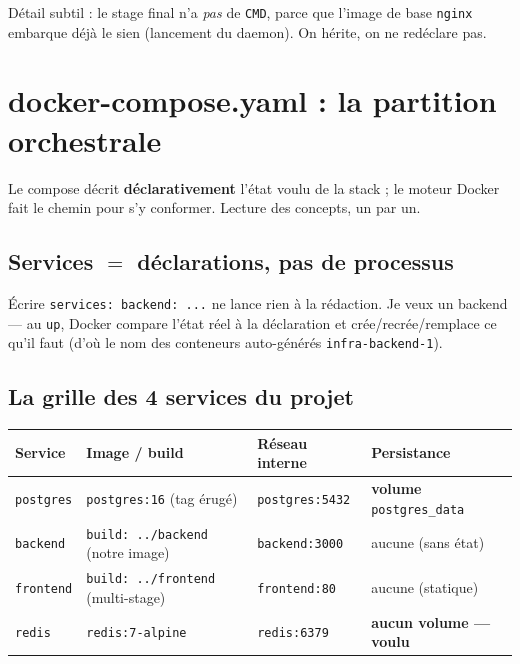 \documentclass[11pt,a4paper]{article}
\begin{document}
Détail subtil : le stage final n'a \emph{pas} de \texttt{CMD}, parce que
l'image de base \texttt{nginx} embarque déjà le sien (lancement du daemon).
On hérite, on ne redéclare pas.

\section{docker-compose.yaml : la partition orchestrale}

Le compose décrit \textbf{déclarativement} l'état voulu de la stack ; le moteur
Docker fait le chemin pour s'y conformer. Lecture des concepts, un par un.

\subsection{Services $=$ déclarations, pas de processus}

Écrire \texttt{services: backend: ...} ne lance rien à la rédaction.
\og Je veux un backend \fg{} --- au \texttt{up}, Docker compare l'état réel à
la déclaration et crée/recrée/remplace ce qu'il faut (d'où le nom des
conteneurs auto-générés \texttt{infra-backend-1}).

\subsection{La grille des 4 services du projet}

\begin{center}
\begin{tabular}{@{}p{2.1cm}p{3.4cm}p{3.1cm}p{3.6cm}@{}}
\toprule
Service & Image / build & Réseau interne & Persistance \\
\midrule
\texttt{postgres} & \texttt{postgres:16} (tag érugé) &
\texttt{postgres:5432} & \textbf{volume} \texttt{postgres\_data} \\
\texttt{backend} & \texttt{build: ../backend} (notre image) &
\texttt{backend:3000} & aucune (sans état) \\
\texttt{frontend} & \texttt{build: ../frontend} (multi-stage) &
\texttt{frontend:80} & aucune (statique) \\
\texttt{redis} & \texttt{redis:7-alpine} & \texttt{redis:6379} &
\textbf{aucun volume --- voulu} \\
\bottomrule
\end{tabular}
\end{center}
\end{document}
